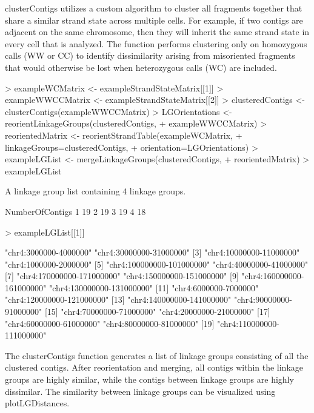 \documentclass{article}
\begin{document}
clusterContigs utilizes a custom algorithm to cluster all fragments together that share a similar strand state across multiple cells.  For example, if two contigs are adjacent on the same chromosome, then they will inherit the same strand state in every cell that is analyzed. The function performs clustering only on homozygous calls (WW or CC) to identify dissimilarity arising from misoriented fragments that would otherwise be lost when heterozygous calls (WC) are included.

\begin{Schunk}
\begin{Sinput}
> exampleWCMatrix <- exampleStrandStateMatrix[[1]]
> exampleWWCCMatrix <- exampleStrandStateMatrix[[2]]
> clusteredContigs <- clusterContigs(exampleWWCCMatrix)
> LGOrientations <- reorientLinkageGroups(clusteredContigs,
+  exampleWWCCMatrix)
> reorientedMatrix <- reorientStrandTable(exampleWCMatrix, 
+ linkageGroups=clusteredContigs, 
+ orientation=LGOrientations)
> exampleLGList <- mergeLinkageGroups(clusteredContigs,
+ reorientedMatrix)
> exampleLGList
\end{Sinput}
\begin{Soutput}
A linkage group list containing  4  linkage groups.

  NumberOfContigs
1              19
2              19
3              19
4              18
\end{Soutput}
\begin{Sinput}
> exampleLGList[[1]]
\end{Sinput}
\begin{Soutput}
 [1] "chr4:3000000-4000000"     "chr4:30000000-31000000"  
 [3] "chr4:10000000-11000000"   "chr4:1000000-2000000"    
 [5] "chr4:100000000-101000000" "chr4:40000000-41000000"  
 [7] "chr4:170000000-171000000" "chr4:150000000-151000000"
 [9] "chr4:160000000-161000000" "chr4:130000000-131000000"
[11] "chr4:6000000-7000000"     "chr4:120000000-121000000"
[13] "chr4:140000000-141000000" "chr4:90000000-91000000"  
[15] "chr4:70000000-71000000"   "chr4:20000000-21000000"  
[17] "chr4:60000000-61000000"   "chr4:80000000-81000000"  
[19] "chr4:110000000-111000000"
\end{Soutput}
\end{Schunk}


The clusterContigs function generates a list of linkage groups consisting of all the clustered contigs.  After reorientation and merging, all contigs within the linkage groups are highly similar, while the contigs between linkage groups are highly dissimilar.  The similarity between linkage groups can be visualized using plotLGDistances.
\end{document}
